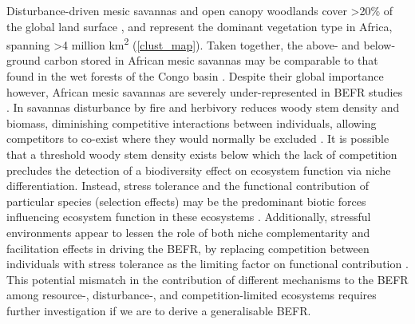 \documentclass[11pt,a4paper]{article}
\begin{document}
Disturbance-driven mesic savannas and open canopy woodlands cover >20\% of the global land surface \citep{Pennington2018, Solbrig1996}, and represent the dominant vegetation type in Africa, spanning >4 million km\textsuperscript{2} \citep{White1987, Ratnam2011, Ryan2016} (\autoref{clust_map}). Taken together, the above- and below-ground carbon stored in African mesic savannas may be comparable to that found in the wet forests of the Congo basin \citep{Houghton2009, Mayaux2008, Spawn2020}. Despite their global importance however, African mesic savannas are severely under-represented in BEFR studies \citep{Clarke2017, Liang2016}. In savannas disturbance by fire \citep{Lehmann2014} and herbivory \citep{Sankaran2008, Levick2009} reduces woody stem density and biomass, diminishing competitive interactions between individuals, allowing competitors to co-exist where they would normally be excluded \citep{Grime1979, Grace1990}. It is possible that a threshold woody stem density exists below which the lack of competition precludes the detection of a biodiversity effect on ecosystem function via niche differentiation. Instead, stress tolerance and the functional contribution of particular species (selection effects) may be the predominant biotic forces influencing ecosystem function in these ecosystems \citep{Lasky2014, Tobner2016}. Additionally, stressful environments appear to lessen the role of both niche complementarity and facilitation effects in driving the BEFR, by replacing competition between individuals with stress tolerance as the limiting factor on functional contribution \citep{Ratcliffe2017, Paquette2011}. This potential mismatch in the contribution of different mechanisms to the BEFR among resource-, disturbance-, and competition-limited ecosystems requires further investigation if we are to derive a generalisable BEFR.
\end{document}
